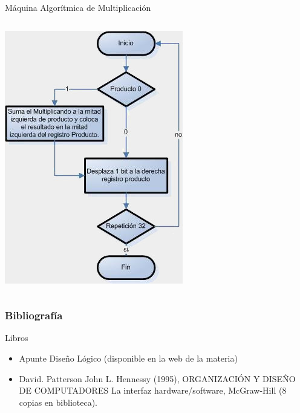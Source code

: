 \documentclass[aspectratio=169,compress]{beamer}
\begin{document}
\begin{footnotesize}
\begin{frame}{Máquina Algorítmica de Multiplicación}
\begin{columns}[onlytextwidth,T]
\includegraphics[scale=0.25]{images/alg.jpg} 
    \end{columns}
\end{frame}


\begin{frame}
 \frametitle{Bibliografía}
Libros
\begin{itemize}
\item Apunte Diseño Lógico (disponible en la web de la materia)
\item David. Patterson John L. Hennessy (1995), ORGANIZACIÓN Y DISEÑO DE COMPUTADORES La interfaz hardware/software, McGraw-Hill (8 copias en biblioteca).
\end{itemize}
\end{frame}


\end{footnotesize}
\end{document}

